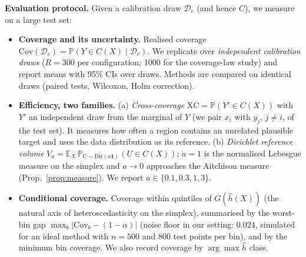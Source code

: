 \documentclass{article}
\newcommand{\hh}{\hat h}
\newcommand{\XC}{\mathrm{XC}}
\newcommand{\Gini}{G}
\newcommand{\PP}{\mathbb{P}}
\newcommand{\EE}{\mathbb{E}}
\begin{document}
\textbf{Evaluation protocol.} Given a calibration draw $\mathcal D_c$ (and hence $C$), we measure on a large test set:
\begin{itemize}
\item \textbf{Coverage and its uncertainty.} Realised coverage $\mathrm{Cov}(\mathcal D_c)=\PP(Y\in C(X)\mid\mathcal D_c)$. We replicate over \emph{independent calibration draws} ($R=300$ per configuration; 1000 for the coverage-law study) and report means with 95\% CIs over draws. Methods are compared on identical draws (paired tests, Wilcoxon, Holm correction).
\item \textbf{Efficiency, two families.} (a) \emph{Cross-coverage} $\XC=\PP(Y'\in C(X))$ with $Y'$ an independent draw from the marginal of $Y$ (we pair $x_i$ with $y_j$, $j\neq i$, of the test set). It measures how often a region contains an unrelated plausible target and uses the data distribution as its reference. (b) \emph{Dirichlet reference volume} $V_a=\EE_X\,\PP_{U\sim\mathrm{Dir}(a\mathbf 1)}(U\in C(X))$; $a=1$ is the normalised Lebesgue measure on the simplex and $a\to0$ approaches the Aitchison measure (Prop.~\ref{prop:measure}). We report $a\in\{0.1,0.3,1,3\}$.
\item \textbf{Conditional coverage.} Coverage within quintiles of $\Gini(\hh(X))$ (the natural axis of heteroscedasticity on the simplex), summarised by the worst-bin gap $\max_b|\mathrm{Cov}_b-(1-\alpha)|$ (noise floor in our setting: $0.024$, simulated for an ideal method with $n=500$ and 800 test points per bin), and by the minimum bin coverage. We also record coverage by $\arg\max\hh$ class.
\end{itemize}
\end{document}
